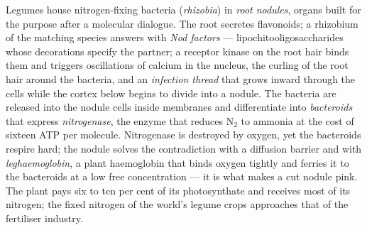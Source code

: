 \begin{definition}\label{def:b3:microbiomes:nodule}
Legumes house nitrogen-fixing bacteria (\emph{rhizobia}) in \emph{root
nodules}, organs built for the purpose after a molecular dialogue. The
root secretes flavonoids; a rhizobium of the matching species answers
with \emph{Nod factors} --- lipochitooligosaccharides whose decorations
specify the partner; a receptor kinase on the root hair binds them and
triggers oscillations of calcium in the nucleus, the curling of the
root hair around the bacteria, and an \emph{infection thread} that
grows inward through the cells while the cortex below begins to divide
into a nodule. The bacteria are released into the nodule cells inside
membranes and differentiate into \emph{bacteroids} that express
\emph{nitrogenase}, the enzyme that reduces N$_{2}$ to ammonia at the
cost of sixteen ATP per molecule. Nitrogenase is destroyed by oxygen,
yet the bacteroids respire hard; the nodule solves the contradiction
with a diffusion barrier and with \emph{leghaemoglobin}, a plant
haemoglobin that binds oxygen tightly and ferries it to the bacteroids
at a low free concentration --- it is what makes a cut nodule pink. The
plant pays six to ten per cent of its photosynthate and receives most
of its nitrogen; the fixed nitrogen of the world's legume crops
approaches that of the fertiliser industry.
\end{definition}

